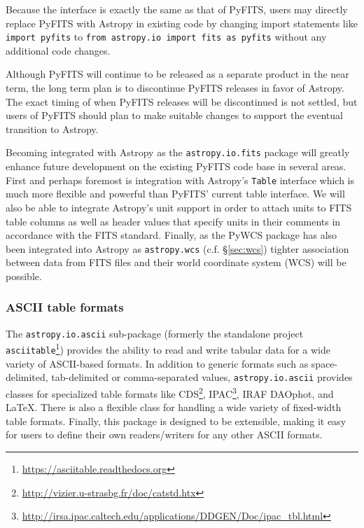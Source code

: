 \documentclass[traditabstract]{aa}
\begin{document}
Because the interface is exactly the same as that of PyFITS, users may directly
replace PyFITS with Astropy in existing code by changing import statements
like \texttt{import pyfits} to \texttt{from astropy.io import fits as pyfits}
without any additional code changes.

Although PyFITS will continue to be released as a separate product in the near
term, the long term plan is to discontinue PyFITS releases in favor of Astropy.
The exact timing of when PyFITS releases will be discontinued is not settled,
but users of PyFITS should plan to make suitable changes to support the eventual
transition to Astropy.

Becoming integrated with Astropy as the \texttt{astropy.io.fits} package will
greatly enhance future development on the existing PyFITS code base in several
areas.  First and perhaps foremost is integration with Astropy's \texttt{Table}
interface which is much more flexible and powerful than PyFITS' current
table interface.
We will also be able to integrate Astropy's unit support in order to attach
units to FITS table columns as well as header values that specify units in
their comments in accordance with the FITS standard.  Finally, as the PyWCS
package has also been integrated into Astropy as \texttt{astropy.wcs}
(c.f. \S\ref{sec:wcs}) tighter association between data from FITS files and their world coordinate system (WCS)
will be possible.


\subsubsection{ASCII table formats}
\label{sec:ascii}

The \texttt{astropy.io.ascii} sub-package (formerly the standalone project
\texttt{asciitable}\footnote{\url{https://asciitable.readthedocs.org}}) provides the
ability to read and write tabular data for a wide variety of ASCII-based
formats.  In addition to generic formats such as space-delimited, tab-delimited or
comma-separated values, \texttt{astropy.io.ascii} provides classes for specialized
table formats like
CDS\footnote{\url{http://vizier.u-strasbg.fr/doc/catstd.htx}},
IPAC\footnote{\url{http://irsa.ipac.caltech.edu/applications/DDGEN/Doc/ipac_tbl.html}},
IRAF DAOphot, and LaTeX.  There is also a flexible class for handling
a wide variety of fixed-width table formats. Finally, this package is designed to be extensible, making it easy for users to define their own readers/writers for any other ASCII formats.
\end{document}
